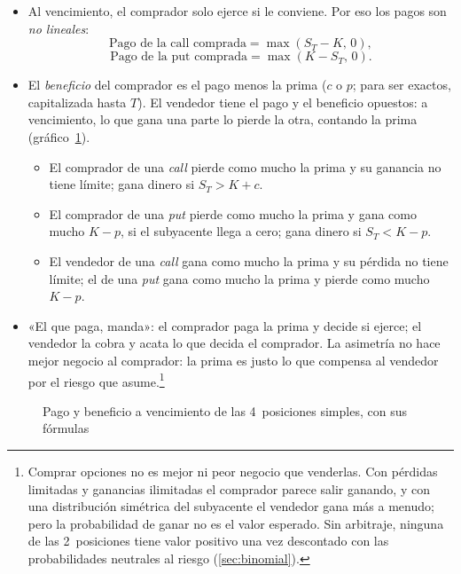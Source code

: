 \documentclass[11pt]{article}
\begin{document}
\begin{itemize}
\item Al vencimiento, el comprador solo ejerce si le conviene. Por eso los pagos son \emph{no lineales}:
  \begin{equation}\label{eq:pago-call}
  \text{Pago de la call comprada}=\max(S_T-K,\,0),
  \end{equation}
  \begin{equation}\label{eq:pago-put}
  \text{Pago de la put comprada}=\max(K-S_T,\,0).
  \end{equation}
\item El \emph{beneficio} del comprador es el pago menos la prima ($c$ o $p$; para ser exactos, capitalizada hasta $T$). El vendedor tiene el pago y el beneficio opuestos: a vencimiento, lo que gana una parte lo pierde la otra, contando la prima (gráfico~\ref{fig:pagos-opciones}).
  \begin{itemize}
  \item El comprador de una \emph{call} pierde como mucho la prima y su ganancia no tiene límite; gana dinero si $S_T>K+c$.
  \item El comprador de una \emph{put} pierde como mucho la prima y gana como mucho $K-p$, si el subyacente llega a cero; gana dinero si $S_T<K-p$.
  \item El vendedor de una \emph{call} gana como mucho la prima y su pérdida no tiene límite; el de una \emph{put} gana como mucho la prima y pierde como mucho $K-p$.
  \end{itemize}
\item «El que paga, manda»: el comprador paga la prima y decide si ejerce; el vendedor la cobra y acata lo que decida el comprador. La asimetría no hace mejor negocio al comprador: la prima es justo lo que compensa al vendedor por el riesgo que asume.\footnote{Comprar opciones no es mejor ni peor negocio que venderlas. Con pérdidas limitadas y ganancias ilimitadas el comprador parece salir ganando, y con una distribución simétrica del subyacente el vendedor gana más a menudo; pero la probabilidad de ganar no es el valor esperado. Sin arbitraje, ninguna de las 2~posiciones tiene valor positivo una vez descontado con las probabilidades neutrales al riesgo (\ref{sec:binomial}).}
\end{itemize}

\begin{figure}[p]
\centering
\caption{Pago y beneficio a vencimiento de las 4~posiciones simples, con sus fórmulas}\label{fig:pagos-opciones}
\end{figure}
\end{document}

